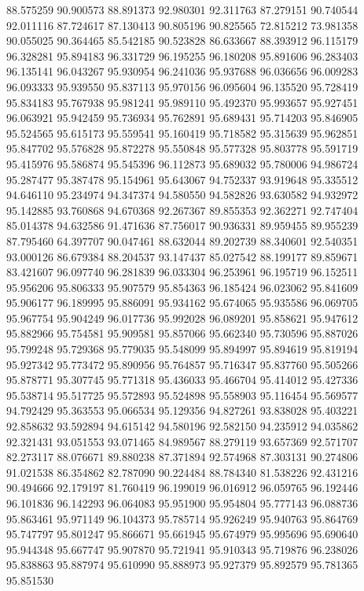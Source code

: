 88.575259
90.900573
88.891373
92.980301
92.311763
87.279151
90.740544
92.011116
87.724617
87.130413
90.805196
90.825565
72.815212
73.981358
90.055025
90.364465
85.542185
90.523828
86.633667
88.393912
96.115179
96.328281
95.894183
96.331729
96.195255
96.180208
95.891606
96.283403
96.135141
96.043267
95.930954
96.241036
95.937688
96.036656
96.009283
96.093333
95.939550
95.837113
95.970156
96.095604
96.135520
95.728419
95.834183
95.767938
95.981241
95.989110
95.492370
95.993657
95.927451
96.063921
95.942459
95.736934
95.762891
95.689431
95.714203
95.846905
95.524565
95.615173
95.559541
95.160419
95.718582
95.315639
95.962851
95.847702
95.576828
95.872278
95.550848
95.577328
95.803778
95.591719
95.415976
95.586874
95.545396
96.112873
95.689032
95.780006
94.986724
95.287477
95.387478
95.154961
95.643067
94.752337
93.919648
95.335512
94.646110
95.234974
94.347374
94.580550
94.582826
93.630582
94.932972
95.142885
93.760868
94.670368
92.267367
89.855353
92.362271
92.747404
85.014378
94.632586
91.471636
87.756017
90.936331
89.959455
89.955239
87.795460
64.397707
90.047461
88.632044
89.202739
88.340601
92.540351
93.000126
86.679384
88.204537
93.147437
85.027542
88.199177
89.859671
83.421607
96.097740
96.281839
96.033304
96.253961
96.195719
96.152511
95.956206
95.806333
95.907579
95.854363
96.185424
96.023062
95.841609
95.906177
96.189995
95.886091
95.934162
95.674065
95.935586
96.069705
95.967754
95.904249
96.017736
95.992028
96.089201
95.858621
95.947612
95.882966
95.754581
95.909581
95.857066
95.662340
95.730596
95.887026
95.799248
95.729368
95.779035
95.548099
95.894997
95.894619
95.819194
95.927342
95.773472
95.890956
95.764857
95.716347
95.837760
95.505266
95.878771
95.307745
95.771318
95.436033
95.466704
95.414012
95.427336
95.538714
95.517725
95.572893
95.524898
95.558903
95.116454
95.569577
94.792429
95.363553
95.066534
95.129356
94.827261
93.838028
95.403221
92.858632
93.592894
94.615142
94.580196
92.582150
94.235912
94.035862
92.321431
93.051553
93.071465
84.989567
88.279119
93.657369
92.571707
82.273117
88.076671
89.880238
87.371894
92.574968
87.303131
90.274806
91.021538
86.354862
82.787090
90.224484
88.784340
81.538226
92.431216
90.494666
92.179197
81.760419
96.199019
96.016912
96.059765
96.192446
96.101836
96.142293
96.064083
95.951900
95.954804
95.777143
96.088736
95.863461
95.971149
96.104373
95.785714
95.926249
95.940763
95.864769
95.747797
95.801247
95.866671
95.661945
95.674979
95.995696
95.690640
95.944348
95.667747
95.907870
95.721941
95.910343
95.719876
96.238026
95.838863
95.887974
95.610990
95.888973
95.927379
95.892579
95.781365
95.851530
